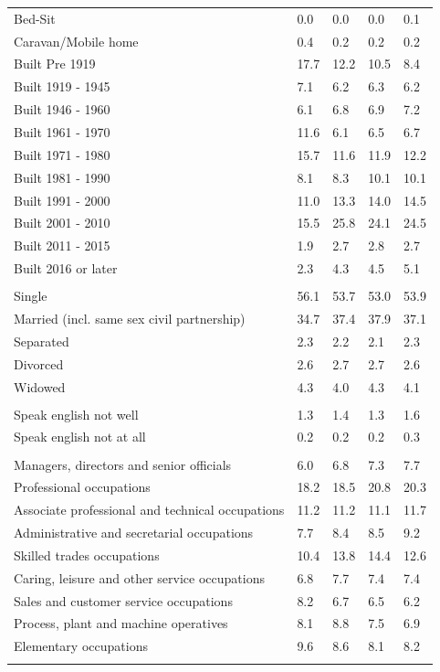 \documentclass{article}
\begin{document}
\begin{table}[h]
\begin{tabular}{KTTTT}
Bed-Sit & 0.0& 0.0& 0.0& 0.1\\
Caravan/Mobile home & 0.4& 0.2& 0.2& 0.2\\
    \hline
Built Pre 1919 & 17.7& 12.2& 10.5&  8.4\\
Built 1919 - 1945 & 7.1& 6.2& 6.3& 6.2\\
Built  1946 - 1960 & 6.1& 6.8& 6.9& 7.2\\
Built  1961 - 1970 & 11.6&  6.1&  6.5&  6.7\\
Built  1971 - 1980 & 15.7& 11.6& 11.9& 12.2\\
Built  1981 - 1990 &  8.1&  8.3& 10.1& 10.1\\
Built  1991 - 2000 & 11.0& 13.3& 14.0& 14.5\\
Built  2001 - 2010 & 15.5& 25.8& 24.1& 24.5\\
Built  2011 - 2015 & 1.9& 2.7& 2.8& 2.7\\
Built  2016 or later & 2.3& 4.3& 4.5& 5.1\\
\hline
    \\
    \hline
Single & 56.1& 53.7& 53.0& 53.9\\
Married (incl. same sex civil partnership) & 34.7& 37.4& 37.9& 37.1\\
Separated  & 2.3& 2.2& 2.1& 2.3\\
Divorced  & 2.6& 2.7& 2.7& 2.6\\
Widowed & 4.3& 4.0& 4.3& 4.1\\
\hline
    \\ 
    \hline
Speak english not well & 1.3& 1.4& 1.3& 1.6\\
Speak english not at all & 0.2& 0.2& 0.2& 0.3\\
\hline
    \\
    \hline
Managers, directors and senior officials & 6.0& 6.8& 7.3& 7.7\\
Professional occupations & 18.2& 18.5& 20.8& 20.3\\
Associate professional and technical occupations & 11.2& 11.2& 11.1& 11.7\\
Administrative and secretarial occupations & 7.7& 8.4& 8.5& 9.2\\
Skilled trades occupations & 10.4& 13.8& 14.4& 12.6\\
Caring, leisure and other service occupations & 6.8& 7.7& 7.4& 7.4\\
Sales and customer service occupations & 8.2& 6.7& 6.5& 6.2\\
Process, plant and machine operatives & 8.1& 8.8& 7.5& 6.9\\
Elementary occupations & 9.6& 8.6& 8.1& 8.2\\
\hline
\end{tabular}
\end{table}
\end{document}
